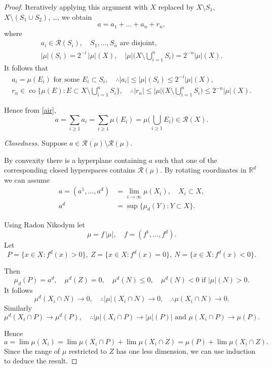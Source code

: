 \documentclass[a4paper]{amsart}
\theoremstyle{plain}
\theoremstyle{definition}
\theoremstyle{remark}
\DeclareMathOperator{\co}{co}
\begin{document}
\begin{proof}
Iteratively applying this argument with $ X $ replaced by $ X\setminus S_1 $, $ X \setminus (S_1\cup S_2) $, \dots , we obtain
\begin{equation} \label{air} 
a = a_1 + \dots + a_n + r_n,
\end{equation} 
where 
\begin{gather*}
a_i \in \mathcal{R} (S_i), \quad S_1,\dots, S_n \text{ are disjoint}, \\
|\mu|(S_i) = 2^{-i}\, |\mu|(X), \quad |\mu|\bigg(X\setminus \bigcup_{i=1}^n S_i\bigg) = 2^{-n} |\mu|(X).
\end{gather*}
It follows that
\begin{gather*}
a_i  = \mu(E_i ) \text{ for some } E_i  \subset S_i, \quad \therefore |a_i| \leq |\mu|(S_i) \leq 2^{-i} |\mu|(X),\\
r_n \in \co \bigg\{ \mu(E ) : E  \subset X \setminus \bigcup_{i=1}^nS_i\bigg\}, \quad 
             \therefore |r_n| \leq |\mu|\bigg(X\setminus \bigcup_{i=1}^n S_i\bigg) \leq 2^{-n} |\mu|(X).
\end{gather*}

Hence from \eqref{air},
\[
a  = \sum_{i\geq 1} a_i  
 = \sum_{i\geq 1} \mu(E_i) = \mu \bigg( \bigcup_{i\geq 1} E_i \bigg) \in \mathcal{R} (X).
 \]
 
 \bigskip 
 \noindent \emph{Closedness.}  
 Suppose $ a \in \overline{\mathcal{R} (\mu)} \setminus \mathcal{R} (\mu) $.  
 
 By convexity there is a hyperplane containing $ a $ such that one of the corresponding closed hyperspaces contains $ \mathcal{R} (\mu) $.  By rotating coordinates in $ \mathbb{R}^d  $ we can assume
 \begin{align*}
 a =(a^1, \dots, a^d) &= \lim_{i\to \infty} \mu (X_i ),  \quad X_i \subset X,\\
 a^d &= \sup \{ \mu_d(Y) : Y \subset X \}.
 \end{align*} 
 
 Using Radon Nikodym let 
 \[
 \mu = f \, |\mu|, \quad f = (f^1,\dots, f^d).
 \]
 Let
 \[
 P = \{ x\in X : f^d(x) > 0 \}, \   Z = \{ x\in X : f^d(x) = 0 \}, \  N = \{ x\in X : f^d(x) < 0 \}.
 \]
 
Then
 \[
 \mu_d(P) = a^d,\quad   \mu^d(Z) = 0,\quad \mu^d(N) \leq 0, \quad  \mu^d(N)  < 0 \text{ if } |\mu|(N)>0 .
 \]
It follows  
\[
\mu^d (X_i \cap N )  \to 0, \quad 
\therefore |\mu| (X_i \cap N )  \to 0, \quad 
\therefore  \mu  (X_i \cap N )  \to 0.
\]
 Similarly
 \[
\mu^d (X_i \cap P )  \to \mu^d(P), \quad 
\therefore |\mu| (X_i \cap P )  \to |\mu|(P)|\text{ and }
   \mu   (X_i \cap P )  \to \mu(P).
\]

 
 Hence
 \[
 a = \lim \mu(X_i) = \lim \mu(X_i\cap P) + \lim \mu(X_i\cap Z) = \mu(P) + \lim \mu(X_i \cap Z ).
 \]
 Since the range of $ \mu $ restricted to $ Z $ has one less dimension, we can use induction to deduce the result.
 \end{proof}  
 
\end{document}
